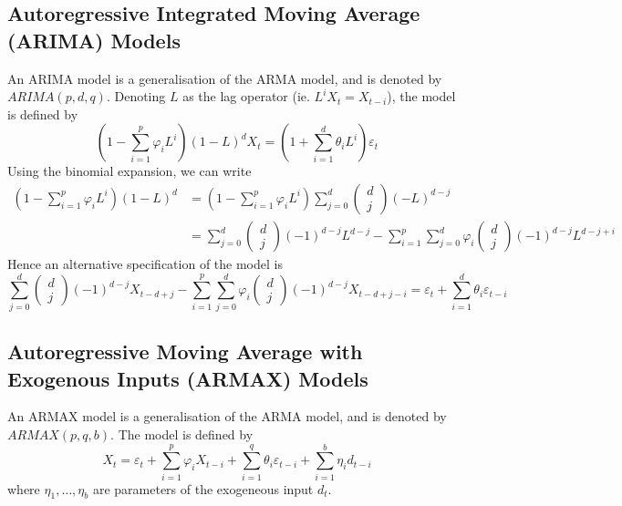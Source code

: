\documentclass[11pt]{report} %
\begin{document}
\subsection{Autoregressive Integrated Moving Average (ARIMA) Models}
An ARIMA model is a generalisation of the ARMA model, and is denoted by $ARIMA\left(p, d, q\right)$. Denoting $L$ as the lag operator (ie. $L^{i}X_{t} = X_{t - i}$), the model is defined by
\begin{equation}
\left(1 - \sum_{i = 1}^{p}\varphi_{i}L^{i}\right)\left(1 - L\right)^{d}X_{t} = \left(1 + \sum_{i = 1}^{d}\theta_{i}L^{i}\right)\varepsilon_{t}
\end{equation}
Using the binomial expansion, we can write
\begin{align}
\left(1 - \sum_{i = 1}^{p}\varphi_{i}L^{i}\right)\left(1 - L\right)^{d} &= \left(1 - \sum_{i = 1}^{p}\varphi_{i}L^{i}\right)\sum_{j = 0}^{d} \begin{pmatrix}
d \\ j
\end{pmatrix} \left(-L\right)^{d - j}  \\
&= \sum_{j = 0}^{d} \begin{pmatrix}
d \\ j
\end{pmatrix} \left(-1\right)^{d - j}L^{d - j} - \sum_{i = 1}^{p}\sum_{j = 0}^{d}\varphi_{i}\begin{pmatrix}
d \\ j
\end{pmatrix}\left(-1\right)^{d- j}L^{d - j + i}
\end{align}
Hence an alternative specification of the model is
\begin{equation}
\sum_{j = 0}^{d} \begin{pmatrix}
d \\ j
\end{pmatrix} \left(-1\right)^{d - j}X_{t - d + j} - \sum_{i = 1}^{p}\sum_{j = 0}^{d}\varphi_{i}\begin{pmatrix}
d \\ j
\end{pmatrix}\left(-1\right)^{d- j}X_{t - d + j - i} = \varepsilon_{t} + \sum_{i = 1}^{d}\theta_{i}\varepsilon_{t - i}
\end{equation}

\subsection{Autoregressive Moving Average with Exogenous Inputs (ARMAX) Models}
An ARMAX model is a generalisation of the ARMA model, and is denoted by $ARMAX\left(p, q, b\right)$. The model is defined by
\begin{equation}
X_{t} = \varepsilon_{t} + \sum_{i = 1}^{p}\varphi_{i}X_{t - i} + \sum_{i = 1}^{q}\theta_{i}\varepsilon_{t - i} + \sum_{i = 1}^{b}\eta_{i}d_{t - i}
\end{equation}
where $\eta_{1}, \dots, \eta_{b}$ are parameters of the exogeneous input $d_{t}$.
\end{document}
